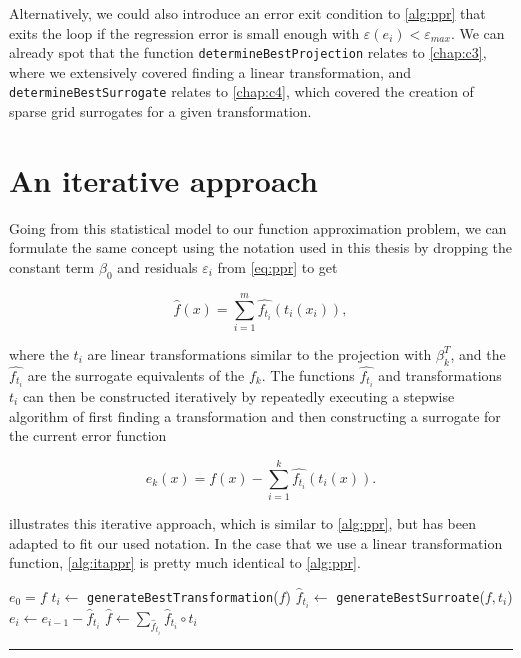 \documentclass[
  a4paper,  %
  twoside,  %
  bibliography=totoc,
  headsepline,
  cleardoublepage=empty,
  parskip=half,
  draft=false
]{scrbook}
\newcommand{\delimit}{{\color{charcoal}\noindent\rule{\textwidth}{1pt}}}
\begin{document}
Alternatively, we could also introduce an error exit condition to \cref{alg:ppr} that exits the loop if the regression error is small enough with $\varepsilon(e_i) < \varepsilon_{max}$.
We can already spot that the function \texttt{determineBestProjection} relates to \cref{chap:c3}, where we extensively covered finding a linear transformation, and \texttt{determineBestSurrogate} relates to \cref{chap:c4}, which covered the creation of sparse grid surrogates for a given transformation.

\section{An iterative approach}

Going from this statistical model to our function approximation problem, we can formulate the same concept using the notation used in this thesis by dropping the constant term $\beta_0$ and residuals $\varepsilon_i$ from \cref{eq:ppr} to get

\begin{equation}
\hat{f}(x)=\sum_{i=1}^m \hat{f_{t_i}}(t_i(x_i)),
\nonumber
\end{equation}

where the $t_i$ are linear transformations similar to the projection with $\beta_k^T$, and the $\hat{f_{t_i}}$ are the surrogate equivalents of the $f_k$.
The functions $\hat{f_{t_i}}$ and transformations $t_i$ can then be constructed iteratively by repeatedly executing a stepwise algorithm of first finding a transformation and then constructing a surrogate for the current error function

\begin{equation}
e_k(x)=f(x) - \sum_{i=1}^k \hat{f_{t_i}}(t_i(x)).
\nonumber
\end{equation}

 illustrates this iterative approach, which is similar to \cref{alg:ppr}, but has been adapted to fit our used notation.
In the case that we use a linear transformation function, \cref{alg:itappr} is pretty much identical to \cref{alg:ppr}.

\begin{mdframed}[style=algstyle,frametitle={\textbf{function} \texttt{transformedSurrogateSum}{$(f, i_{\text{max}})$}}]
\normalsize
\vspace{5.5mm}
\begin{algorithmic}[1]
    \State $e_0 = f$
    	\State $t_i \gets$ \texttt{generateBestTransformation}($f$)
    	\State $\hat{f}_{t_i} \gets$ \texttt{generateBestSurroate}($f, t_i$)
    	\State $e_i \gets e_{i - 1} - \hat{f}_{t_i}$
    \EndFor
    \State $\hat{f} \gets \sum_{\hat{f}_{t_i}} \hat{f}_{t_i} \circ t_i$
    \State {}
\end{algorithmic}
\vspace{-1.5mm}
\delimit
	\label{alg:itappr}
\end{mdframed}
\end{document}
